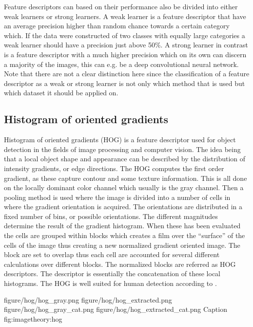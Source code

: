 Feature descriptors can based on their performance also be divided into either weak learners or strong learners. A weak learner is a feature descriptor that have an average precision higher than random chance towards a certain category which. If the data were constructed of two classes with equally large categories a weak learner should have a precision just above 50\%. A strong learner in contrast is a feature descriptor with a much higher precision which on its own can discern a majority of the images, this can e.g. be a deep convolutional neural network. Note that there are not a clear distinction here since the classification of a feature descriptor as a weak or strong learner is not only which method that is used but which dataset it should be applied on. 


\subsection{Histogram of oriented gradients}
\label{sec:hog_feature}
Histogram of oriented gradients (HOG) is a feature descriptor used for object detection in the fields of image processing and computer vision. The idea being that a local object shape and appearance can be described by the distribution of intensity gradients, or edge directions. The HOG computes the first order gradient, as these capture contour and some texture information. This is all done on the locally dominant color channel which usually is the gray channel. Then a pooling method is used where the image is divided into a number of cells in where the gradient orientation is acquired. The orientations are distributed in a fixed number of bins, or possible orientations. The different magnitudes determine the result of the gradient histogram. When these has been evaluated the cells are grouped within blocks which creates a film over the ``surface'' of the cells of the image thus creating a new normalized gradient oriented image. The block are set to overlap thus each cell are accounted for several different calculations over different blocks. The normalized blocks are referred as HOG descriptors. The descriptor is essentially the concatenation of these local histograms. The HOG is well suited for human detection according to \cite{dalal2005histograms}. 

\fourfigure
{figure/hog/hog_gray.png}
{figure/hog/hog_extracted.png}
{figure/hog/hog_gray_cat.png}
{figure/hog/hog_extracted_cat.png}
{Caption}
{fig:imagetheory:hog} 

